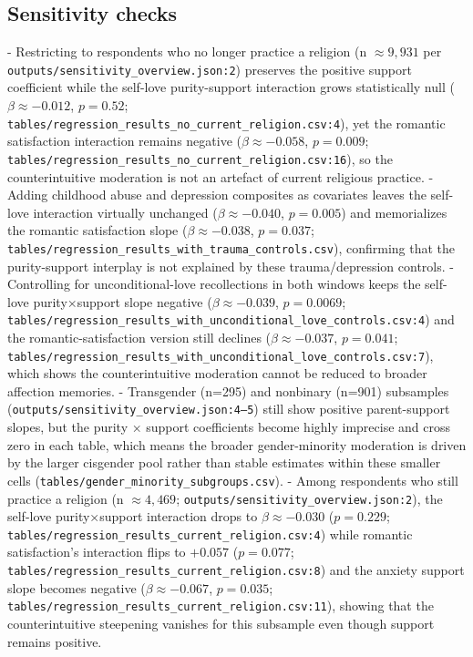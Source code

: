 \documentclass[12pt]{article}
\begin{document}
\subsection{Sensitivity checks}
- Restricting to respondents who no longer practice a religion (n $\approx 9,931$ per \texttt{outputs/sensitivity\_overview.json:2}) preserves the positive support coefficient while the self-love purity-support interaction grows statistically null ($\beta \approx -0.012$, $p=0.52$; \texttt{tables/regression\_results\_no\_current\_religion.csv:4}), yet the romantic satisfaction interaction remains negative ($\beta \approx -0.058$, $p=0.009$; \texttt{tables/regression\_results\_no\_current\_religion.csv:16}), so the counterintuitive moderation is not an artefact of current religious practice.
- Adding childhood abuse and depression composites as covariates leaves the self-love interaction virtually unchanged ($\beta \approx -0.040$, $p=0.005$) and memorializes the romantic satisfaction slope ($\beta \approx -0.038$, $p=0.037$; \texttt{tables/regression\_results\_with\_trauma\_controls.csv}), confirming that the purity-support interplay is not explained by these trauma/depression controls.
- Controlling for unconditional-love recollections in both windows keeps the self-love purity×support slope negative ($\beta \approx -0.039$, $p=0.0069$; \texttt{tables/regression\_results\_with\_unconditional\_love\_controls.csv:4}) and the romantic-satisfaction version still declines ($\beta \approx -0.037$, $p=0.041$; \texttt{tables/regression\_results\_with\_unconditional\_love\_controls.csv:7}), which shows the counterintuitive moderation cannot be reduced to broader affection memories.
- Transgender (n=295) and nonbinary (n=901) subsamples (\texttt{outputs/sensitivity\_overview.json:4--5}) still show positive parent-support slopes, but the purity × support coefficients become highly imprecise and cross zero in each table, which means the broader gender-minority moderation is driven by the larger cisgender pool rather than stable estimates within these smaller cells (\texttt{tables/gender\_minority\_subgroups.csv}).
- Among respondents who still practice a religion (n $\approx 4,469$; \texttt{outputs/sensitivity\_overview.json:2}), the self-love purity×support interaction drops to $\beta \approx -0.030$ ($p=0.229$; \texttt{tables/regression\_results\_current\_religion.csv:4}) while romantic satisfaction's interaction flips to $+0.057$ ($p=0.077$; \texttt{tables/regression\_results\_current\_religion.csv:8}) and the anxiety support slope becomes negative ($\beta \approx -0.067$, $p=0.035$; \texttt{tables/regression\_results\_current\_religion.csv:11}), showing that the counterintuitive steepening vanishes for this subsample even though support remains positive.
\end{document}
